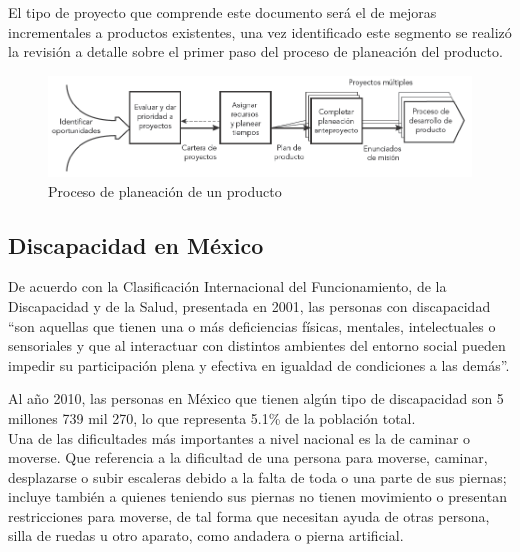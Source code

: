 El tipo de proyecto que comprende este documento ser\'a el de mejoras incrementales a productos existentes, una vez identificado este segmento se realiz\'o la revisi\'on a detalle sobre el primer paso del proceso de planeación del producto.

\begin{figure}[th]
	\centering
	\includegraphics[width=.8\textwidth]{Figures/elproceso.png}
	\decoRule
	\caption{Proceso de planeaci\'on de un producto \parencite{desarrollo}}
	\label{fig:elproceso}
\end{figure}

\subsection{Discapacidad en M\'exico}

De acuerdo con la Clasificaci\'on Internacional del Funcionamiento, de la Discapacidad y de la Salud, presentada en 2001, las personas con discapacidad “son aquellas que tienen una o más deficiencias f\'isicas, mentales, intelectuales o sensoriales y que al interactuar con distintos ambientes del entorno social pueden impedir su participaci\'on plena y efectiva en igualdad de condiciones a las dem\'as”.

Al año 2010, las personas en M\'exico que tienen alg\'un tipo de discapacidad son 5 millones 739 mil 270, lo que representa 5.1\% de la población total.\\
Una de las dificultades m\'as importantes a nivel nacional es la de caminar o moverse. Que referencia a la dificultad de una persona para moverse, caminar, desplazarse o subir escaleras debido a la falta de toda o una parte de sus piernas; incluye tambi\'en a quienes teniendo sus piernas no tienen movimiento o presentan restricciones para moverse, de tal forma que necesitan ayuda de otras persona, silla de ruedas u otro aparato, como andadera o pierna artificial.

